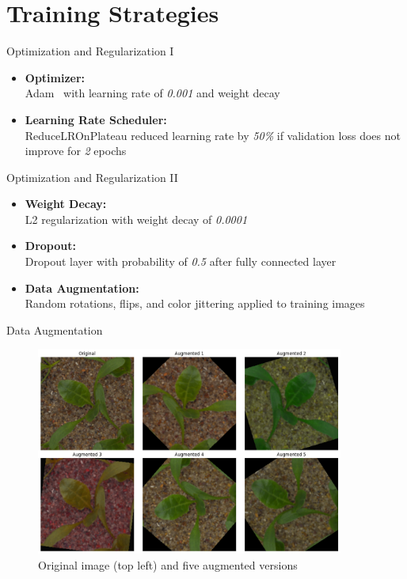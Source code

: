 \documentclass{beamer}
\begin{document}
\section{Training Strategies}
\begin{frame}{Optimization and Regularization I}
    \begin{itemize}
        \item \textbf{Optimizer:\\}Adam~\cite{kingma2017adammethodstochasticoptimization} with learning rate of \textit{0.001} and weight decay
        \item \textbf{Learning Rate Scheduler:\\}ReduceLROnPlateau reduced learning rate by \textit{50\%} if validation loss does not improve for \textit{2} epochs
    \end{itemize}
\end{frame}

\begin{frame}{Optimization and Regularization II}
    \begin{itemize}
        \item \textbf{Weight Decay:\\}L2 regularization with weight decay of \textit{0.0001}
        \item \textbf{Dropout:\\}Dropout layer with probability of \textit{0.5} after fully connected layer
        \item \textbf{Data Augmentation:\\}Random rotations, flips, and color jittering applied to training images
    \end{itemize}
\end{frame}

\begin{frame}{Data Augmentation}
    \begin{figure}
        \centering
        \includegraphics[width=0.9\textwidth]{../resources/data_augmentation.png}
        \caption{Original image (top left) and five augmented versions}\label{fig:data-augmentation}
    \end{figure}
\end{frame}
\end{document}
